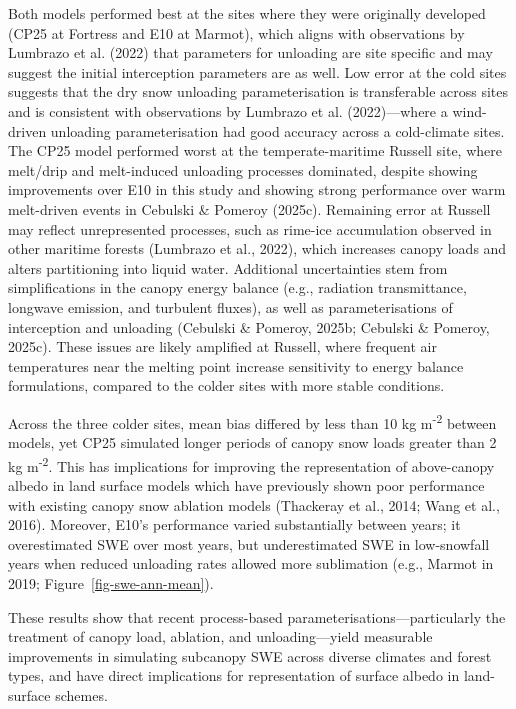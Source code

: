 \documentclass[
  letterpaper,
]{tex/uofsthesis-cs}
\begin{document}
Both models performed best at the sites where they were originally
developed (CP25 at Fortress and E10 at Marmot), which aligns with
observations by Lumbrazo et al. (2022) that parameters for unloading are
site specific and may suggest the initial interception parameters are as
well. Low error at the cold sites suggests that the dry snow unloading
parameterisation is transferable across sites and is consistent with
observations by Lumbrazo et al. (2022)---where a wind-driven unloading
parameterisation had good accuracy across a cold-climate sites. The CP25
model performed worst at the temperate-maritime Russell site, where
melt/drip and melt-induced unloading processes dominated, despite
showing improvements over E10 in this study and showing strong
performance over warm melt-driven events in Cebulski \& Pomeroy (2025c).
Remaining error at Russell may reflect unrepresented processes, such as
rime-ice accumulation observed in other maritime forests (Lumbrazo et
al., 2022), which increases canopy loads and alters partitioning into
liquid water. Additional uncertainties stem from simplifications in the
canopy energy balance (e.g., radiation transmittance, longwave emission,
and turbulent fluxes), as well as parameterisations of interception and
unloading (Cebulski \& Pomeroy, 2025b; Cebulski \& Pomeroy, 2025c).
These issues are likely amplified at Russell, where frequent air
temperatures near the melting point increase sensitivity to energy
balance formulations, compared to the colder sites with more stable
conditions.

Across the three colder sites, mean bias differed by less than 10 kg
m\textsuperscript{-2} between models, yet CP25 simulated longer periods
of canopy snow loads greater than 2 kg m\textsuperscript{-2}. This has
implications for improving the representation of above-canopy albedo in
land surface models which have previously shown poor performance with
existing canopy snow ablation models (Thackeray et al., 2014; Wang et
al., 2016). Moreover, E10's performance varied substantially between
years; it overestimated SWE over most years, but underestimated SWE in
low-snowfall years when reduced unloading rates allowed more sublimation
(e.g., Marmot in 2019; Figure~\ref{fig-swe-ann-mean}).

These results show that recent process-based
parameterisations---particularly the treatment of canopy load, ablation,
and unloading---yield measurable improvements in simulating subcanopy
SWE across diverse climates and forest types, and have direct
implications for representation of surface albedo in land-surface
schemes.
\end{document}
